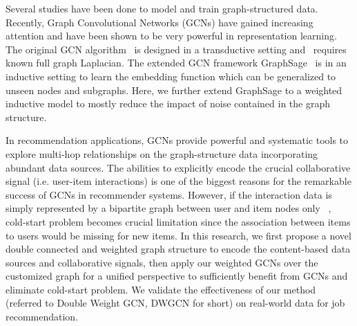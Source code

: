 \documentclass[manuscript,screen,review]{acmart}
\begin{document}

Several studies have been done to model and train graph-structured data.  Recently, Graph Convolutional Networks (GCNs) \cite{kipf2016variational,kipf2016semi,hamilton2017inductive} have gained increasing attention and have been shown to be very powerful in representation learning. The original GCN algorithm~\cite{kipf2016semi} is designed in a transductive setting and~\cite{kipf2016variational} requires known full graph Laplacian. The extended GCN framework GraphSage~\cite{kipf2016variational} is in an inductive setting to learn the embedding function which can be generalized to unseen nodes and subgraphs. Here, we further extend GraphSage to a weighted inductive model to mostly reduce the impact of noise contained in the graph structure.  

In recommendation applications, GCNs provide powerful and systematic tools to explore multi-hop relationships on the graph-structure data incorporating abundant data sources. The abilities to explicitly encode the crucial collaborative signal (i.e. user-item interactions) is one of the biggest reasons for the remarkable success of GCNs in recommender systems. However, if the interaction data is simply represented by a bipartite graph between user and item nodes only ~\cite{ying2018graph,eksombatchai2018pixie}, cold-start problem becomes crucial limitation since the association between items to users would be missing for new items. In this research, we first propose a novel double connected and weighted graph structure to encode the content-based data sources and collaborative signals, then apply our weighted GCNs over the customized graph for a unified perspective to sufficiently benefit from GCNs and eliminate cold-start problem. We validate the effectiveness of our method (referred to Double Weight GCN, DWGCN for short) on real-world data for job recommendation.


\end{document}
